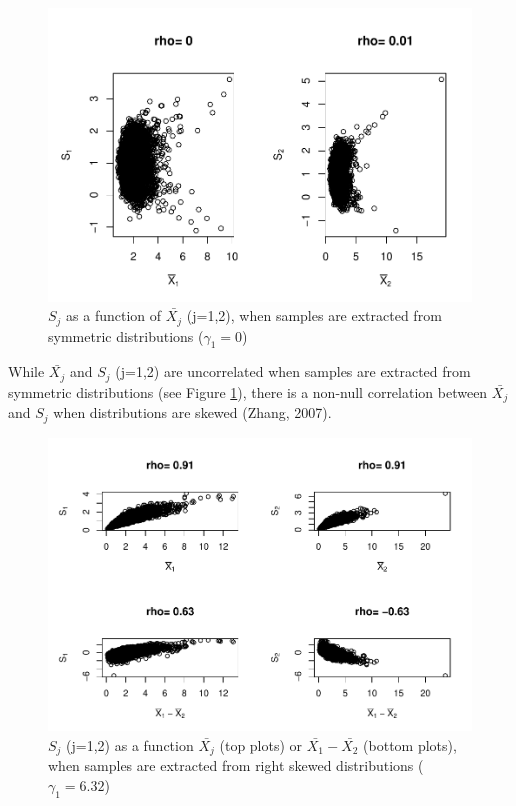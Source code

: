 \documentclass[
  man]{apa6}
\begin{document}
\begin{figure}
\centering
\includegraphics{Correlation_files/figure-latex/pltSDMEANHombalsym-1.pdf}
\caption{\label{fig:pltSDMEANHombalsym}\(S_j\) as a function of \(\bar{X_j}\) (j=1,2), when samples are extracted from symmetric distributions (\(\gamma_1 = 0\))}
\end{figure}

While \(\bar{X_j}\) and \(S_j\) (j=1,2) are uncorrelated when samples are extracted from symmetric distributions (see Figure \ref{fig:pltSDMEANHombalsym}), there is a non-null correlation between \(\bar{X_j}\) and \(S_j\) when distributions are skewed (Zhang, 2007).

\begin{figure}
\centering
\includegraphics{Correlation_files/figure-latex/pltSDHombalRskew-1.pdf}
\caption{\label{fig:pltSDHombalRskew}\(S_j\) (j=1,2) as a function \(\bar{X_j}\) (top plots) or \(\bar{X_1}-\bar{X_2}\) (bottom plots), when samples are extracted from right skewed distributions (\(\gamma_1 = 6.32\))}
\end{figure}
\end{document}
